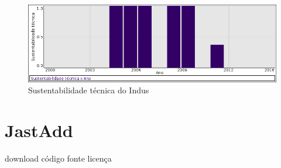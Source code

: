 \begin{figure}[h]
  \center
  \includegraphics[scale=0.50]{imagens/softwares-charts/indus.png}
  \caption{Sustentabilidade técnica do Indus}
\end{figure}


\section{JastAdd}
\checkmark download
\checkmark código fonte
\checkmark licença


